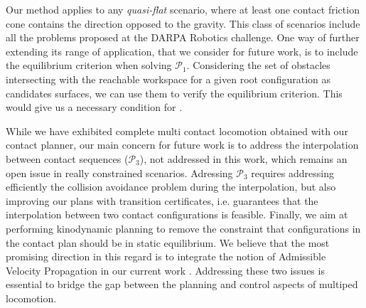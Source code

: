 Our method applies to any \textit{quasi-flat} scenario, where at least one contact friction cone contains
the direction opposed to the gravity. This class of scenarios include all the problems proposed at the DARPA Robotics challenge.
One way of further extending its range of application, that we consider for future work, is to include the equilibrium criterion when solving $\mathcal{P}_1$.
Considering the set of obstacles intersecting with the reachable workspace for a given root configuration as candidates surfaces, we can use them to verify the equilibrium criterion.
This would give us a necessary condition for \equilibriumfeasibility.

While we have exhibited complete multi contact locomotion obtained with our contact planner, our main concern for future work is to address the interpolation
between contact sequences ($\mathcal{P}_3$), not addressed in this work, which remains an open issue in really constrained scenarios.
Adressing $\mathcal{P}_3$ requires addressing efficiently the collision avoidance problem during the interpolation,	but also improving
our plans with transition certificates, i.e. guarantees that the interpolation between two contact configurations is feasible.
Finally, we aim at performing kinodynamic planning to remove the constraint that configurations in the contact plan should be in static equilibrium. We believe that the most promising direction in this regard is to integrate the notion of Admissible Velocity Propagation in our current work \citep{DBLP:conf/rss/PhamCN13}.
Addressing these two issues is essential to bridge the gap between the planning and control aspects of multiped locomotion.

